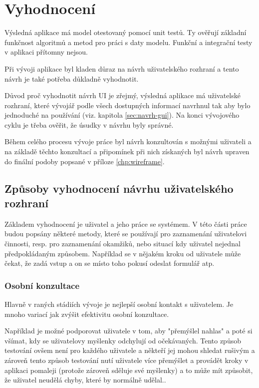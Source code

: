 \chapter{Vyhodnocení}
Výsledná aplikace má model otestovaný pomocí unit testů. Ty ověřují základní funkčnost algoritmů a metod pro práci s daty modelu. Funkční a integrační testy v aplikaci přítomny nejsou.

Při vývoji aplikace byl kladen důraz na návrh uživatelského rozhraní a tento návrh je také potřeba důkladně vyhodnotit.

Důvod proč vyhodnotit návrh UI je zřejmý, výsledná aplikace má uživatelské rozhraní, které vývojář podle všech dostupných informací navrhnul tak aby bylo jednoduché na používání (viz. kapitola \ref{sec:navrh-gui}). Na konci vývojového cyklu je třeba ověřit, že úsudky v návrhu byly správné.  

Během celého procesu vývoje práce byl návrh konzultován s možnými uživateli a na základě těchto konzultací a připomínek při nich získaných byl návrh upraven do finální podoby popsané v příloze \ref{chp:wireframe}.

\section{Způsoby vyhodnocení návrhu uživatelského rozhraní}
Základem vyhodnocení je uživatel a jeho práce se systémem. V této části práce budou popsány některé metody, které se používají pro zaznamenání uživatelovi činnosti, resp. pro zaznamenání okamžiků, nebo situací kdy uživatel nejednal předpokládaným způsobem. Například se v nějakém kroku od uživatele může čekat, že zadá vstup a on se místo toho pokusí odeslat formulář atp.

\subsection{Osobní konzultace}
Hlavně v raných stádiích vývoje je nejlepší osobní kontakt s uživatelem\cite{stone2005user}. Je mnoho variací jak zvýšit efektivitu osobní konzultace.

Například je možné podporovat uživatele v tom, aby "přemýšlel nahlas" a poté si všímat, kdy se uživatelovy myšlenky odchylují od očekávaných. Tento způsob testování ovšem není pro každého uživatele a někteří jej mohou shledat rušivým a zároveň tento způsob testování nutí uživatele více přemýšlet a provádět kroky v aplikaci pomaleji (protože zároveň sděluje své myšlenky) a to může mít způsobit, že uživatel neudělá chyby, které by normálně udělal.\cite{stone2005user}.

